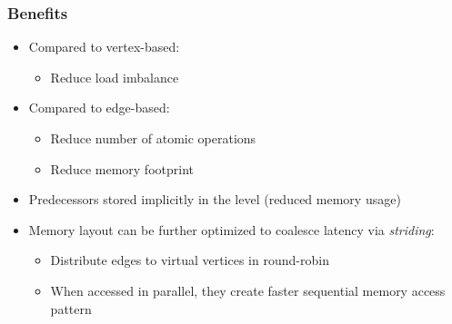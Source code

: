 \begin{frame}
  \frametitle{Benefits}

  \begin{itemize}
    \item Compared to vertex-based:
    \begin{itemize}
      \item Reduce load imbalance
    \end{itemize}
    \item Compared to edge-based:
    \begin{itemize}
    \item Reduce number of atomic operations
    \item Reduce memory footprint
    \end{itemize}
    \item Predecessors stored implicitly in the \spdag level (reduced memory usage)
    \item Memory layout can be further optimized to coalesce latency via \emph{striding}:
    \begin{itemize}
      \item Distribute edges to virtual vertices in round-robin
      \item When accessed in parallel, they create faster sequential memory access pattern
    \end{itemize}
  \end{itemize}
\end{frame}


